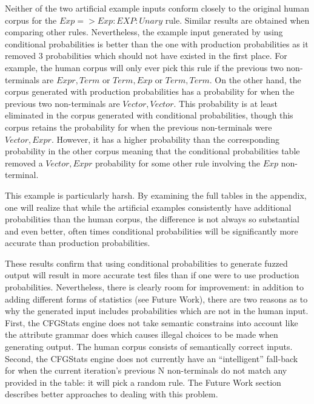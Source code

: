 Neither of the two artificial example inputs conform closely to the
original human corpus for the $Exp => Exp:EXP:Unary$ rule. Similar results are
obtained when comparing other rules. Nevertheless, the example input generated
by using conditional probabilities is better than the one with production
probabilities as it removed 3 probabilities which should not have existed in
the first place. For example, the human corpus will only ever pick this rule if
the previous two non-terminals are $Expr, Term$ or $Term, Exp$ or $Term, Term$.
On the other hand, the corpus generated with production probabilities has a
probability for when the previous two non-terminals are $Vector, Vector$. This
probability is at least eliminated in the corpus generated with conditional
probabilities, though this corpus retains the probability for when the previous
non-terminals were $Vector, Expr$. However, it has a higher probability
than the corresponding probability in the other corpus meaning that the
conditional probabilities table removed a $Vector, Expr$ probability for some
other rule involving the $Exp$ non-terminal.

This example is particularly harsh. By examining the full tables in the
appendix, one will realize that while the artificial examples consistently
have additional probabilities than the human corpus, the difference is not
always so substantial and even better, often times conditional probabilities
will be significantly more accurate than production probabilities.

These results confirm that using conditional probabilities to generate fuzzed
output will result in more accurate test files than if one were to use
production probabilities. Nevertheless, there is clearly room for improvement:
in addition to adding different forms of statistics (see Future Work), there
are two reasons as to why the generated input includes probabilities which are
not in the human input. First, the CFGStats engine does not take semantic
constrains into account like the attribute grammar does which causes illegal
choices to be made when generating output. The human corpus consists of
semantically correct inputs. Second, the CFGStats engine does not currently
have an ``intelligent'' fall-back for when the current iteration's previous N
non-terminals do not match any provided in the table: it will pick a random
rule. The Future Work section describes better approaches to dealing with this
problem.
















